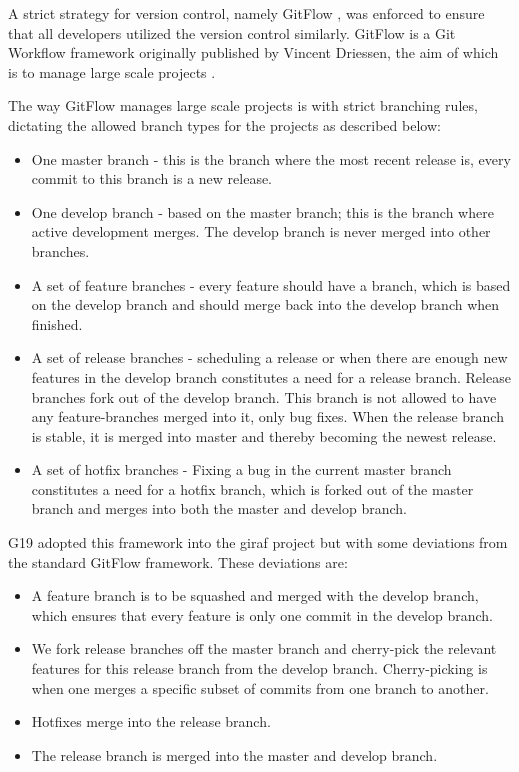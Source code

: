 A strict strategy for version control, namely GitFlow \cite{GitFlow}, was enforced to ensure that all developers utilized the version control similarly. GitFlow is a Git Workflow framework originally published by Vincent Driessen, the aim of which is to manage large scale projects \cite{GitFlow}.

The way GitFlow manages large scale projects is with strict branching rules, dictating the allowed branch types for the projects \cite{GitFlow} as described below:

\begin{itemize}
    \item One master branch - this is the branch where the most recent release is, every commit to this branch is a new release.
    \item One develop branch - based on the master branch; this is the branch where active development merges. The develop branch is never merged into other branches.
    \item A set of feature branches - every feature should have a branch, which is based on the develop branch and should merge back into the develop branch when finished.
    \item A set of release branches - scheduling a release or when there are enough new features in the develop branch constitutes a need for a release branch. Release branches fork out of the develop branch. This branch is not allowed to have any feature-branches merged into it, only bug fixes. When the release branch is stable, it is merged into master and thereby becoming the newest release.
    \item A set of hotfix branches - Fixing a bug in the current master branch constitutes a need for a hotfix branch, which is forked out of the master branch and merges into both the master and develop branch.
\end{itemize}

\Gls{G19} adopted this framework into the \gls{giraf} project \cite{ProcessGitFlow} but with some deviations from the standard GitFlow framework. These deviations are:

\begin{itemize}
    \item A feature branch is to be squashed and merged with the develop branch, which ensures that every feature is only one commit in the develop branch.
    \item We fork release branches off the master branch and cherry-pick the relevant features for this release branch from the develop branch. Cherry-picking is when one merges a specific subset of commits from one branch to another.
    \item Hotfixes merge into the release branch.
    \item The release branch is merged into the master and develop branch.
\end{itemize}

